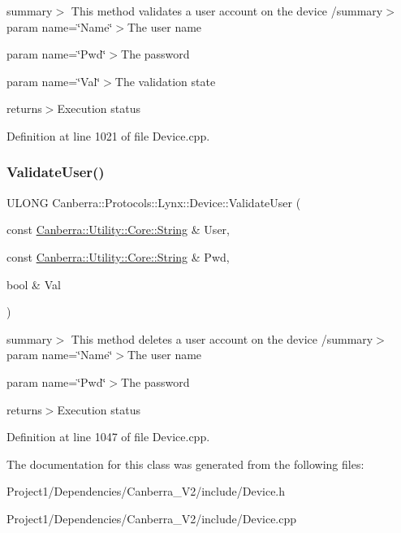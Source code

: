 summary$>$ This method validates a user account on the device /summary$>$ param name=\char`\"{}\+Name\char`\"{}$>$The user name 

param name=\char`\"{}\+Pwd\char`\"{}$>$The password 

param name=\char`\"{}\+Val\char`\"{}$>$The validation state 

returns$>$Execution status

Definition at line 1021 of file Device.\+cpp.

\mbox{\label{class_canberra_1_1_protocols_1_1_lynx_1_1_device_aa5895622f6c9b7006da39245302d3a4a_aa5895622f6c9b7006da39245302d3a4a}} 
\subsubsection{\texorpdfstring{Validate\+User()}{ValidateUser()}}
{\footnotesize\ttfamily U\+L\+O\+NG Canberra\+::\+Protocols\+::\+Lynx\+::\+Device\+::\+Validate\+User (\begin{DoxyParamCaption}\item[{const \hyperlink{class_canberra_1_1_utility_1_1_core_1_1_string}{Canberra\+::\+Utility\+::\+Core\+::\+String} \&}]{User,  }\item[{const \hyperlink{class_canberra_1_1_utility_1_1_core_1_1_string}{Canberra\+::\+Utility\+::\+Core\+::\+String} \&}]{Pwd,  }\item[{bool \&}]{Val }\end{DoxyParamCaption})}

summary$>$ This method deletes a user account on the device /summary$>$ param name=\char`\"{}\+Name\char`\"{}$>$The user name 

param name=\char`\"{}\+Pwd\char`\"{}$>$The password 

returns$>$Execution status

Definition at line 1047 of file Device.\+cpp.



The documentation for this class was generated from the following files\+:\begin{DoxyCompactItemize}
\item 
Project1/\+Dependencies/\+Canberra\+\_\+\+V2/include/Device.\+h\item 
Project1/\+Dependencies/\+Canberra\+\_\+\+V2/include/Device.\+cpp\end{DoxyCompactItemize}
